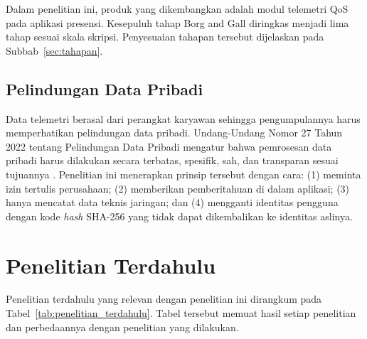 Dalam penelitian ini, produk yang dikembangkan adalah modul telemetri QoS pada aplikasi presensi. Kesepuluh tahap Borg and Gall diringkas menjadi lima tahap sesuai skala skripsi. Penyesuaian tahapan tersebut dijelaskan pada Subbab~\ref{sec:tahapan}.

\subsection{Pelindungan Data Pribadi}
Data telemetri berasal dari perangkat karyawan sehingga pengumpulannya harus memperhatikan pelindungan data pribadi. Undang-Undang Nomor 27 Tahun 2022 tentang Pelindungan Data Pribadi mengatur bahwa pemrosesan data pribadi harus dilakukan secara terbatas, spesifik, sah, dan transparan sesuai tujuannya \parencite{uupdp2022}. Penelitian ini menerapkan prinsip tersebut dengan cara: (1) meminta izin tertulis perusahaan; (2) memberikan pemberitahuan di dalam aplikasi; (3) hanya mencatat data teknis jaringan; dan (4) mengganti identitas pengguna dengan kode \textit{hash} SHA-256 yang tidak dapat dikembalikan ke identitas aslinya.

\section{Penelitian Terdahulu}
Penelitian terdahulu yang relevan dengan penelitian ini dirangkum pada Tabel~\ref{tab:penelitian_terdahulu}. Tabel tersebut memuat hasil setiap penelitian dan perbedaannya dengan penelitian yang dilakukan.

